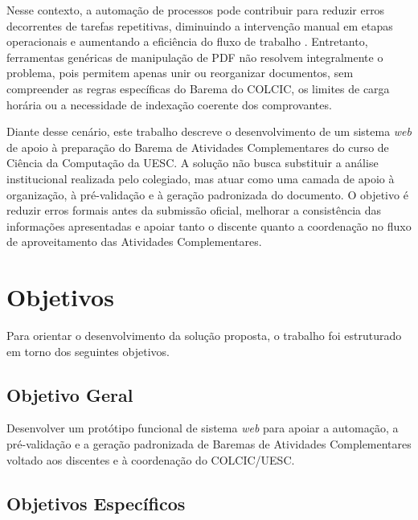 Nesse contexto, a automação de processos pode contribuir para reduzir erros decorrentes de tarefas repetitivas, diminuindo a intervenção manual em etapas operacionais e aumentando a eficiência do fluxo de trabalho \cite{abidemi2024role}. Entretanto, ferramentas genéricas de manipulação de PDF não resolvem integralmente o problema, pois permitem apenas unir ou reorganizar documentos, sem compreender as regras específicas do Barema do COLCIC, os limites de carga horária ou a necessidade de indexação coerente dos comprovantes.

Diante desse cenário, este trabalho descreve o desenvolvimento de um sistema \textit{web} de apoio à preparação do Barema de Atividades Complementares do curso de Ciência da Computação da UESC. A solução não busca substituir a análise institucional realizada pelo colegiado, mas atuar como uma camada de apoio à organização, à pré-validação e à geração padronizada do documento. O objetivo é reduzir erros formais antes da submissão oficial, melhorar a consistência das informações apresentadas e apoiar tanto o discente quanto a coordenação no fluxo de aproveitamento das Atividades Complementares.

\section{Objetivos}

Para orientar o desenvolvimento da solução proposta, o trabalho foi estruturado em torno dos seguintes objetivos.

\subsection{Objetivo Geral}

Desenvolver um protótipo funcional de sistema \textit{web} para apoiar a automação, a pré-validação e a geração padronizada de Baremas de Atividades Complementares voltado aos discentes e à coordenação do COLCIC/UESC.

\subsection{Objetivos Específicos}

